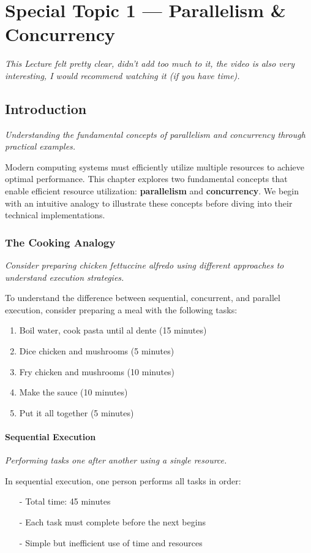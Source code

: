\documentclass[../../compsys.tex]{subfiles}
\begin{document}
\raggedbottom
\chapter{Special Topic 1 — Parallelism \& Concurrency}
\vfill
\textit{This Lecture felt pretty clear, didn't add too much to it, the video is also very interesting, I would recommend watching it (if you have time).}
\raggedbottom
\section{Introduction}
\textit{Understanding the fundamental concepts of parallelism and concurrency through practical examples.}

Modern computing systems must efficiently utilize multiple resources to achieve optimal performance. This chapter explores two fundamental concepts that enable efficient resource utilization: \textbf{parallelism} and \textbf{concurrency}. We begin with an intuitive analogy to illustrate these concepts before diving into their technical implementations.
\newpage
\subsection{The Cooking Analogy}
\textit{Consider preparing chicken fettuccine alfredo using different approaches to understand execution strategies.}

To understand the difference between sequential, concurrent, and parallel execution, consider preparing a meal with the following tasks:
\begin{enumerate}
  \item Boil water, cook pasta until al dente (15 minutes)
  \item Dice chicken and mushrooms (5 minutes)
  \item Fry chicken and mushrooms (10 minutes)
  \item Make the sauce (10 minutes)
  \item Put it all together (5 minutes)
\end{enumerate}

\subsubsection{Sequential Execution}
\textit{Performing tasks one after another using a single resource.}

In sequential execution, one person performs all tasks in order:
\begin{itemize}
  \item[-] Total time: 45 minutes
  \item[-] Each task must complete before the next begins
  \item[-] Simple but inefficient use of time and resources
\end{itemize}
\end{document}
